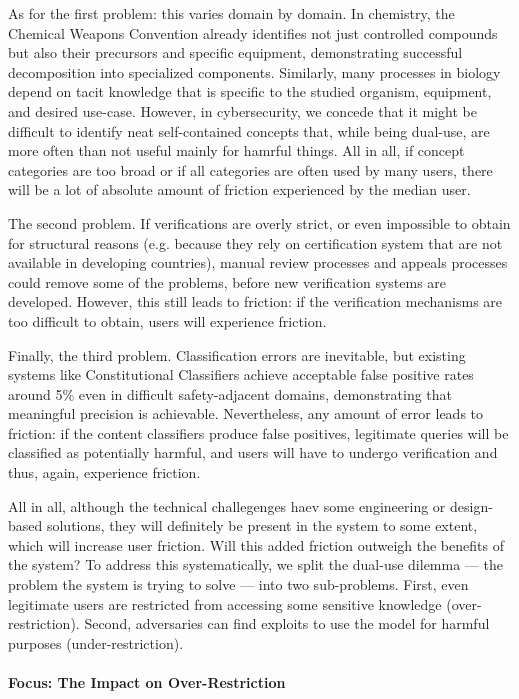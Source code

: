 \documentclass{article}
\theoremstyle{plain}
\theoremstyle{definition}
\theoremstyle{remark}
\begin{document}
As for the first problem: this varies domain by domain.
In chemistry, the Chemical Weapons Convention already identifies not just controlled compounds but also their precursors and specific equipment, demonstrating successful decomposition into specialized components.
Similarly, many processes in biology depend on tacit knowledge that is specific to the studied organism, equipment, and desired use-case.
However, in cybersecurity, we concede that it might be difficult to identify neat self-contained concepts that, while being dual-use, are more often than not useful mainly for hamrful things.
All in all, if concept categories are too broad or if all categories are often used by many users, there will be a lot of absolute amount of friction experienced by the median user.

The second problem.
If verifications are overly strict, or even impossible to obtain for structural reasons (e.g. because they rely on certification system that are not available in developing countries), manual review processes and appeals processes could remove some of the problems, before new verification systems are developed.
However, this still leads to friction: if the verification mechanisms are too difficult to obtain, users will experience friction.

Finally, the third problem.
Classification errors are inevitable, but existing systems like Constitutional Classifiers achieve acceptable false positive rates around 5\% even in difficult safety-adjacent domains, demonstrating that meaningful precision is achievable.
Nevertheless, any amount of error leads to friction: if the content classifiers produce false positives, legitimate queries will be classified as potentially harmful, and users will have to undergo verification and thus, again, experience friction.

All in all, although the technical challegenges haev some engineering or design-based solutions, they will definitely be present in the system to some extent, which will increase user friction.
Will this added friction outweigh the benefits of the system?
To address this systematically, we split the dual-use dilemma --- the problem the system is trying to solve --- into two sub-problems.
First, even legitimate users are restricted from accessing some sensitive knowledge (over-restriction).
Second, adversaries can find exploits to use the model for harmful purposes (under-restriction).

\paragraph{Focus: The Impact on Over-Restriction}
\end{document}
